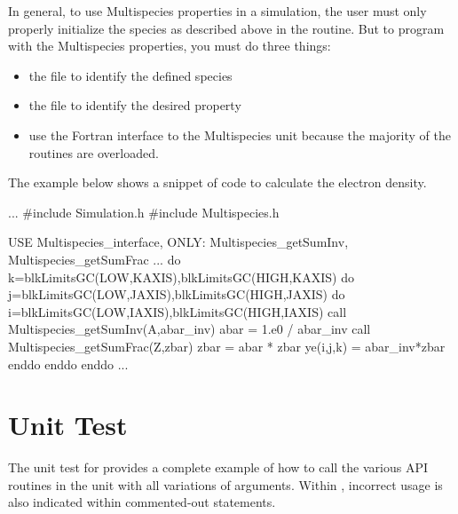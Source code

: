 In general, to use Multispecies properties in a simulation,
the user must only properly initialize the species as described above in the
 routine.
But to program with the Multispecies properties, you 
must do three things:
\begin{itemize}
\item {} the  file to identify the defined species 
\item {} the  file to identify the desired property
\item use the Fortran interface to the Multispecies unit because the majority of
the routines are overloaded.
\end{itemize}
The example below shows a snippet of code to calculate the electron density.
\begin{codeseg}
...
#include Simulation.h
#include Multispecies.h

    USE Multispecies_interface, ONLY:  Multispecies_getSumInv, Multispecies_getSumFrac
...
    do k=blkLimitsGC(LOW,KAXIS),blkLimitsGC(HIGH,KAXIS)
        do j=blkLimitsGC(LOW,JAXIS),blkLimitsGC(HIGH,JAXIS)
           do i=blkLimitsGC(LOW,IAXIS),blkLimitsGC(HIGH,IAXIS)
              call Multispecies_getSumInv(A,abar_inv)
              abar = 1.e0 / abar_inv
              call Multispecies_getSumFrac(Z,zbar)
              zbar = abar * zbar
              ye(i,j,k) = abar_inv*zbar
           enddo
        enddo
     enddo
...
\end{codeseg}

\section{Unit Test}
\label{Sec:MultispeciesUnitTest}
The unit test for  provides a complete example of how to call the
various API routines in the unit with all variations of arguments.  Within 
, incorrect usage is also
indicated within commented-out statements.
